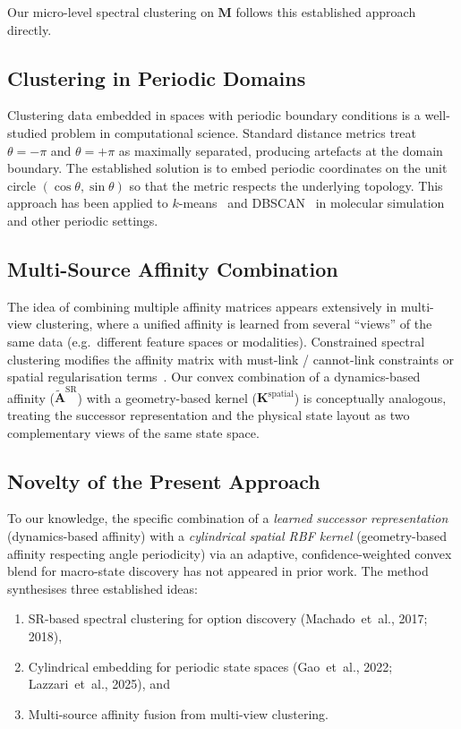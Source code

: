 \documentclass[11pt,a4paper]{article}
\begin{document}
Our micro-level spectral clustering on $\mathbf{M}$ follows this
established approach directly.

\subsection{Clustering in Periodic Domains}

Clustering data embedded in spaces with periodic boundary conditions is a
well-studied problem in computational science.  Standard distance metrics
treat $\theta = -\pi$ and $\theta = +\pi$ as maximally separated,
producing artefacts at the domain boundary.  The established solution is
to embed periodic coordinates on the unit circle
$(\cos\theta, \sin\theta)$ so that the metric respects the underlying
topology.  This approach has been applied to $k$-means~\cite{gao2022} and
DBSCAN~\cite{lazzari2025} in molecular simulation and other periodic
settings.

\subsection{Multi-Source Affinity Combination}

The idea of combining multiple affinity matrices appears extensively in
multi-view clustering, where a unified affinity is learned from several
``views'' of the same data (e.g.\ different feature spaces or
modalities).  Constrained spectral clustering modifies the affinity
matrix with must-link / cannot-link constraints or spatial regularisation
terms~\cite{vonluxburg2007}.  Our convex combination of a dynamics-based
affinity ($\widetilde{\mathbf{A}}^{\text{SR}}$) with a geometry-based
kernel ($\mathbf{K}^{\text{spatial}}$) is conceptually analogous,
treating the successor representation and the physical state layout as
two complementary views of the same state space.

\subsection{Novelty of the Present Approach}

To our knowledge, the specific combination of a \emph{learned successor
representation} (dynamics-based affinity) with a \emph{cylindrical
spatial RBF kernel} (geometry-based affinity respecting angle
periodicity) via an adaptive, confidence-weighted convex blend for
macro-state discovery has not appeared in prior work.  The method
synthesises three established ideas:
\begin{enumerate}
\item SR-based spectral clustering for option discovery
      (Machado~et~al., 2017; 2018),
\item Cylindrical embedding for periodic state spaces
      (Gao~et~al., 2022; Lazzari~et~al., 2025), and
\item Multi-source affinity fusion from multi-view clustering.
\end{enumerate}
\end{document}
